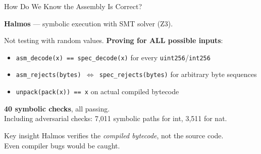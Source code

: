 \documentclass[aspectratio=169,10pt]{beamer}
\begin{document}
\begin{frame}{How Do We Know the Assembly Is Correct?}

\textbf{Halmos} --- symbolic execution with SMT solver (Z3).

\bigskip

Not testing with random values. \textbf{Proving for ALL possible inputs}:

\begin{itemize}
  \item \texttt{asm\_decode(x) == spec\_decode(x)} for every \texttt{uint256}/\texttt{int256}
  \item \texttt{asm\_rejects(bytes) $\Leftrightarrow$ spec\_rejects(bytes)} for arbitrary byte sequences
  \item \texttt{unpack(pack(x)) == x} on actual compiled bytecode
\end{itemize}

\bigskip

\begin{center}
\textbf{40 symbolic checks}, all passing.\\
Including adversarial checks: 7,011 symbolic paths for int, 3,511 for nat.
\end{center}

\bigskip
\begin{exampleblock}{Key insight}
Halmos verifies the \emph{compiled bytecode}, not the source code.\\
Even compiler bugs would be caught.
\end{exampleblock}
\end{frame}
\end{document}
